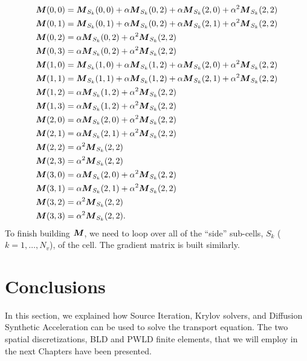 {\allowdisplaybreaks
\begin{align}
  & \boldsymbol{M}(0,0) =  \boldsymbol{M}_{S_k}(0,0) + \alpha \boldsymbol{M}_{S_k}(0,2) + \alpha
  \boldsymbol{M}_{S_k}(2,0) + \alpha^2 \boldsymbol{M}_{S_k}(2,2)\\
  & \boldsymbol{M}(0,1) =  \boldsymbol{M}_{S_k}(0,1) + \alpha \boldsymbol{M}_{S_k}(0,2) + \alpha
  \boldsymbol{M}_{S_k}(2,1) + \alpha^2 \boldsymbol{M}_{S_k}(2,2)\\
  & \boldsymbol{M}(0,2) =  \alpha \boldsymbol{M}_{S_k}(0,2) + \alpha^2 \boldsymbol{M}_{S_k}(2,2)\\
  & \boldsymbol{M}(0,3) =  \alpha \boldsymbol{M}_{S_k}(0,2) + \alpha^2 \boldsymbol{M}_{S_k}(2,2)\\
  & \boldsymbol{M}(1,0) =  \boldsymbol{M}_{S_k}(1,0) + \alpha \boldsymbol{M}_{S_k}(1,2) + \alpha
  \boldsymbol{M}_{S_k}(2,0) + \alpha^2 \boldsymbol{M}_{S_k}(2,2)\\
  & \boldsymbol{M}(1,1) =  \boldsymbol{M}_{S_k}(1,1) + \alpha \boldsymbol{M}_{S_k}(1,2) + \alpha
  \boldsymbol{M}_{S_k}(2,1) + \alpha^2 \boldsymbol{M}_{S_k}(2,2)\\
  & \boldsymbol{M}(1,2) =  \alpha \boldsymbol{M}_{S_k}(1,2) + \alpha^2 \boldsymbol{M}_{S_k}(2,2)\\
  & \boldsymbol{M}(1,3) =  \alpha \boldsymbol{M}_{S_k}(1,2) + \alpha^2 \boldsymbol{M}_{S_k}(2,2)\\
  & \boldsymbol{M}(2,0) =  \alpha \boldsymbol{M}_{S_k}(2,0) + \alpha^2 \boldsymbol{M}_{S_k}(2,2)\\
  & \boldsymbol{M}(2,1) =  \alpha \boldsymbol{M}_{S_k}(2,1) + \alpha^2 \boldsymbol{M}_{S_k}(2,2)\\
  & \boldsymbol{M}(2,2) =  \alpha^2 \boldsymbol{M}_{S_k}(2,2)\\
  & \boldsymbol{M}(2,3) =  \alpha^2 \boldsymbol{M}_{S_k}(2,2)\\
  & \boldsymbol{M}(3,0) =  \alpha \boldsymbol{M}_{S_k}(2,0) + \alpha^2 \boldsymbol{M}_{S_k}(2,2)\\
  & \boldsymbol{M}(3,1) =  \alpha \boldsymbol{M}_{S_k}(2,1) + \alpha^2 \boldsymbol{M}_{S_k}(2,2)\\
  & \boldsymbol{M}(3,2) =  \alpha^2 \boldsymbol{M}_{S_k}(2,2)\\
  & \boldsymbol{M}(3,3) =  \alpha^2 \boldsymbol{M}_{S_k}(2,2). 
\end{align}}    
To finish building $\boldsymbol{M}$, we need to loop over all of the ``side''
sub-cells, $S_k$ ($k=1,\hdots,N_v$), of the cell. The gradient matrix is built 
similarly.

\section{Conclusions}
In this section, we explained how Source Iteration, Krylov solvers, and
Diffusion Synthetic Acceleration can be used to solve the transport equation. 
The two spatial discretizations, BLD and PWLD finite elements, that we will 
employ in the next Chapters have been presented.
